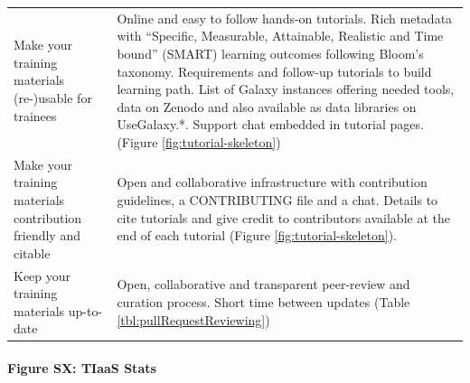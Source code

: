 \documentclass[10pt,letterpaper]{article}
\begin{document}
\begin{table}[h!]
\begin{adjustwidth}{-2in}{0in}
\begin{tabular}{p{}p{}}
		Make your training materials (re-)usable for trainees                          & Online and easy to follow hands-on tutorials. Rich metadata with ``Specific, Measurable, Attainable, Realistic and Time bound'' (SMART) learning outcomes following Bloom's taxonomy. Requirements and follow-up tutorials to build learning path. List of Galaxy instances offering needed tools, data on Zenodo and also available as data libraries on UseGalaxy.*. Support chat embedded in tutorial pages. (Figure \ref{fig:tutorial-skeleton})\\
		Make your training materials contribution friendly and citable                & Open and collaborative infrastructure with contribution guidelines, a CONTRIBUTING file and a chat. Details to cite tutorials and give credit to contributors available at the end of each tutorial (Figure \ref{fig:tutorial-skeleton}).\\
		Keep your training materials up-to-date                                       & Open, collaborative and transparent peer-review and curation process. Short time between updates (Table \ref{tbl:pullRequestReviewing})\\
	\end{tabular}
	\end{adjustwidth}
\end{table}

\paragraph{Figure SX: TIaaS Stats}
\end{document}
